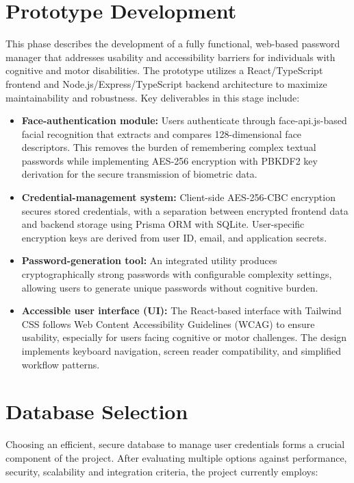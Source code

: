 \section{Prototype Development}
This phase describes the development of a fully functional, web-based password manager that addresses usability and accessibility barriers for individuals with cognitive and motor disabilities. The prototype utilizes a React/TypeScript frontend and Node.js/Express/TypeScript backend architecture to maximize maintainability and robustness. Key deliverables in this stage include:

\begin{itemize}
  \item \textbf{Face-authentication module:} Users authenticate through face-api.js-based facial recognition that extracts and compares 128-dimensional face descriptors. This removes the burden of remembering complex textual passwords while implementing AES-256 encryption with PBKDF2 key derivation for the secure transmission of biometric data.
  
  \item \textbf{Credential-management system:} Client-side AES-256-CBC encryption secures stored credentials, with a separation between encrypted frontend data and backend storage using Prisma ORM with SQLite. User-specific encryption keys are derived from user ID, email, and application secrets.
  
  \item \textbf{Password-generation tool:} An integrated utility produces cryptographically strong passwords with configurable complexity settings, allowing users to generate unique passwords without cognitive burden.
  
  \item \textbf{Accessible user interface (UI):} The React-based interface with Tailwind CSS follows Web Content Accessibility Guidelines (WCAG) to ensure usability, especially for users facing cognitive or motor challenges. The design implements keyboard navigation, screen reader compatibility, and simplified workflow patterns.
\end{itemize}


\section{Database Selection}
Choosing an efficient, secure database to manage user credentials forms a crucial component of the project. After evaluating multiple options against performance, security, scalability and integration criteria, the project currently employs:

